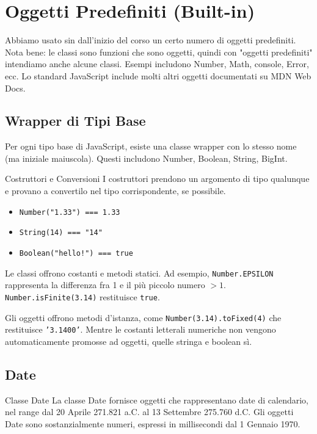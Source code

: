 \section{Oggetti Predefiniti (Built-in)}
Abbiamo usato sin dall'inizio del corso un certo numero di oggetti predefiniti. Nota bene: le classi sono funzioni che sono oggetti, quindi con "oggetti predefiniti" intendiamo anche alcune classi. Esempi includono Number, Math, console, Error, ecc. Lo standard JavaScript include molti altri oggetti documentati su MDN Web Docs.

\subsection{Wrapper di Tipi Base}
Per ogni tipo base di JavaScript, esiste una classe wrapper con lo stesso nome (ma iniziale maiuscola). Questi includono Number, Boolean, String, BigInt. 

\begin{definition}{Costruttori e Conversioni}
I costruttori prendono un argomento di tipo qualunque e provano a convertilo nel tipo corrispondente, se possibile.
\begin{itemize}
    \item \texttt{Number("1.33") === 1.33} 
    \item \texttt{String(14) === "14"} 
    \item \texttt{Boolean("hello!") === true} 
\end{itemize}
\end{definition}

Le classi offrono costanti e metodi statici. Ad esempio, \texttt{Number.EPSILON} rappresenta la differenza fra 1 e il più piccolo numero $>1$. \texttt{Number.isFinite(3.14)} restituisce \texttt{true}.

Gli oggetti offrono metodi d'istanza, come \texttt{Number(3.14).toFixed(4)} che restituisce \texttt{'3.1400'}. Mentre le costanti letterali numeriche non vengono automaticamente promosse ad oggetti, quelle stringa e boolean sì.

\subsection{Date}
\begin{definition}{Classe Date}
La classe Date fornisce oggetti che rappresentano date di calendario, nel range dal 20 Aprile 271.821 a.C. al 13 Settembre 275.760 d.C. Gli oggetti Date sono sostanzialmente numeri, espressi in millisecondi dal 1 Gennaio 1970.
\end{definition}

